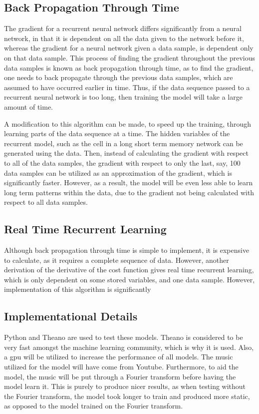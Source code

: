 \documentclass{article}
\begin{document}
\subsection{Back Propagation Through Time}
The gradient for a recurrent neural network differs significantly from a neural
network, in that it is dependent on all the data given to the network before it,
whereas the gradient for a neural network given a data sample, is dependent only
on that data sample. This process of finding the gradient throughout the
previous data samples is known as back propagation through time, as to find the
gradient, one needs to back propagate through the previous data samples, which
are assumed to have occurred earlier in time. Thus, if the data sequence passed
to a recurrent neural network is too long, then training the model will take a
large amount of time.

A modification to this algorithm can be made, to speed up the training, through
learning parts of the data sequence at a time. The hidden variables of the
recurrent model, such as the cell in a long short term memory network can be
generated using the data. Then, instead of calculating the gradient with respect
to all of the data samples, the gradient with respect to only the last, say, 100
data samples can be utilized as an approximation of the gradient, which is
significantly faster. However, as a result, the model will be even less able to
learn long term patterns within the data, due to the gradient not being
calculated with respect to all data samples.


\subsection{Real Time Recurrent Learning}
Although back propagation through time is simple to implement, it is
expensive to calculate, as it requires a complete sequence of data. However,
another derivation of the derivative of the cost function gives real time
recurrent learning, which is only dependent on some stored variables, and one
data sample. However, implementation of this algorithm is significantly 

\subsection{Implementational Details}
Python and Theano are used to test these models. Theano is considered to be very
fast amongst the machine learning community, which is why it is used. Also, a
gpu will be utilized to increase the performance of all models. The music
utilized for the model will have come from Youtube. Furthermore, to aid the
model, the music will be put through a Fourier transform before having the model
learn it. This is purely to produce nicer results, as when testing without the
Fourier transform, the model took longer to train and produced more static,
as opposed to the model trained on the Fourier transform.
\end{document}
